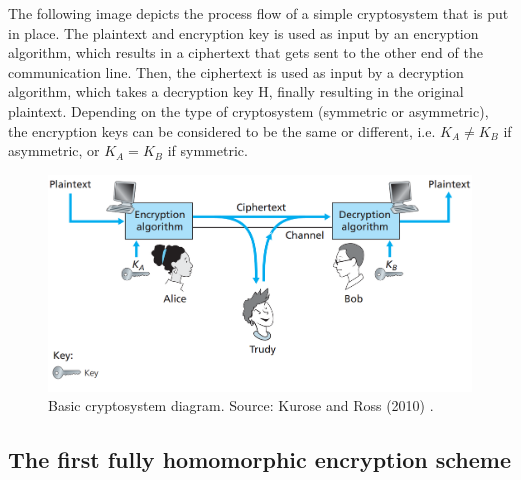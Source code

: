 The following image depicts the process flow of a simple cryptosystem that is put in place. The plaintext and encryption key is used as input by an encryption algorithm, which results in a ciphertext that gets sent to the other end of the communication line. Then, the ciphertext is used as input by a decryption algorithm, which takes a decryption key H, finally resulting in the original plaintext. Depending on the type of cryptosystem (symmetric or asymmetric), the encryption keys can be considered to be the same or different, i.e. $K_{A}\ne K_{B}$ if asymmetric, or $K_{A} = K_{B}$ if symmetric.

\begin{figure}[H]
  \centerline{\includegraphics[width=14cm]{img/basic_crypto}}
  \caption{Basic cryptosystem diagram. Source: Kurose and Ross (2010) \cite{kurose2010computer}.}
\end{figure}

\subsection{The first fully homomorphic encryption scheme}


